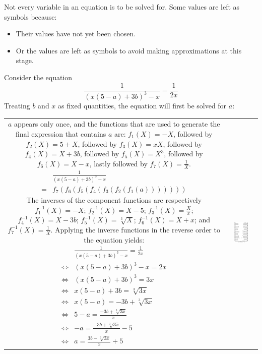 \documentclass{article}
\begin{document}
Not every variable in an equation is to be solved for. Some values are left as symbols because:
\begin{itemize}
\item Their values have not yet been chosen. 
\item Or the values are left as symbols to avoid making approximations at this stage. 
\end{itemize}

Consider the equation
\[\frac{1}{(x(5-a) + 3b)^3 - x} = \frac{1}{2x}\]
Treating \(b\) and \(x\) as fixed quantities, the equation will first be solved for \(a\):

\begin{tabular}{cc}
\parbox{0.4\textwidth}{
\(a\) appears only once, and the functions that are used to generate the final expression that contains \(a\) are: \(f_1(X) = -X\), followed by \(f_2(X) = 5 + X\), followed by \(f_3(X) = xX\), followed by \(f_4(X) = X + 3b\), followed by \(f_5(X) = X^3\), followed by \(f_6(X) = X - x\), lastly followed by \(f_7(X) = \frac{1}{X}\). 
\begin{align*}
& \frac{1}{(x(5-a) + 3b)^3 - x} \\
= & f_7(f_6(f_5(f_4(f_3(f_2(f_1(a)))))))
\end{align*}
The inverses of the component functions are respectively \(f_1^{-1}(X) = -X\); \(f_2^{-1}(X) = X - 5\); \(f_3^{-1}(X) = \frac{X}{x}\); \(f_4^{-1}(X) = X - 3b\); \(f_5^{-1}(X) = \sqrt[3]{X}\); \(f_6^{-1}(X) = X + x\); and \(f_7^{-1}(X) = \frac{1}{X}\). Applying the inverse functions in the reverse order to the equation yields:
\begin{align*}
& \frac{1}{(x(5-a) + 3b)^3 - x} = \frac{1}{2x} \\
\iff & (x(5-a) + 3b)^3 - x = 2x \\
\iff & (x(5-a) + 3b)^3 = 3x \\
\iff & x(5-a) + 3b = \sqrt[3]{3x} \\
\iff & x(5-a) = -3b + \sqrt[3]{3x} \\
\iff & 5 - a = \frac{-3b + \sqrt[3]{3x}}{x} \\
\iff & -a = \frac{-3b + \sqrt[3]{3x}}{x} - 5 \\
\iff & a = \frac{3b - \sqrt[3]{3x}}{x} + 5
\end{align*}
} & \parbox{0.5\textwidth}{
\includegraphics[width = 0.5\textwidth]{solving_equation_2}
}
\end{tabular}
\end{document}
